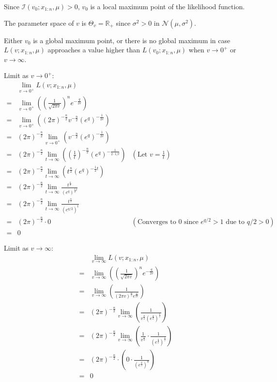 \documentclass{article}
\begin{document}
\begin{ssolution}
Since \(\mathcal{I}(v_0;x_{1:n},\mu) > 0\), \(v_0\) is a local maximum point of the likelihood function.

The parameter space of \(v\)  is \(\Theta_v = \mathbb{R_+}\) since \(\sigma^2>0\) in \(\mathcal{N}(\mu,\sigma^2)\).

Either \(v_0\) is a global maximum point, or there is no global maximum in case
\(L(v;x_{1:n},\mu)\) approaches a value higher than \(L(v_0;x_{1:n},\mu)\) when
\(v \to 0^+\) or \(v \to \infty\).

Limit as \(v\to 0^+\):
\begin{align*}
	& \lim_{v\to 0^+} L(v;x_{1:n},\mu) \\
	=& \lim_{v\to 0^+} \left(\left(\frac{1}{\sqrt{2\pi v}}\right)^n e^{-\frac{q}{2v}} \right) \\
	=& \lim_{v\to 0^+} \left((2\pi)^{-\frac{n}{2}}v^{-\frac{n}{2}} (e^{q})^{-\frac{1}{2v}} \right) \\
	=& (2\pi)^{-\frac{n}{2}}\lim_{v\to 0^+} \left(v^{-\frac{n}{2}} (e^{q})^{-\frac{1}{2v}} \right) \\
	=& (2\pi)^{-\frac{n}{2}}\lim_{t\to \infty} \left(\left(\frac{1}{t}\right)^{-\frac{n}{2}} (e^{q})^{-\frac{1}{2\cdot 1/t}} \right) & (\text{Let }v=\frac{1}{t}) \\
	=& (2\pi)^{-\frac{n}{2}}\lim_{t\to \infty} \left(t^{\frac{n}{2}} (e^{q})^{-\frac{1}{2}t} \right) \\
	=& (2\pi)^{-\frac{n}{2}}\lim_{t\to \infty} \frac{t^{\frac{n}{2}}}{(e^{q})^{\frac{1}{2}t}} \\
	=& (2\pi)^{-\frac{n}{2}}\lim_{t\to \infty} \frac{t^{\frac{n}{2}}}{(e^{q/2})^{t}} \\
	=& (2\pi)^{-\frac{n}{2}}\cdot 0 & (\text{Converges to }0\text{ since }e^{q/2}>1\text{ due to }q/2>0) \\
	=& 0
\end{align*}

Limit as \(v \to \infty\):
\begin{align*}
	& \lim_{v\to \infty} L(v;x_{1:n},\mu) \\
	=& \lim_{v\to \infty} \left(\left(\frac{1}{\sqrt{2\pi v}}\right)^n e^{-\frac{q}{2v}} \right) \\
	=& \lim_{v\to \infty} \left(\frac{1}{(2\pi v)^{\frac{n}{2}}e^{\frac{q}{2v}}} \right) \\
	=& (2\pi)^{-\frac{n}{2}}\lim_{v\to \infty} \left(\frac{1}{v^{\frac{n}{2}}(e^{\frac{q}{2}})^\frac{1}{v}} \right) \\
	=& (2\pi)^{-\frac{n}{2}}\lim_{v\to \infty} \left(\frac{1}{v^{\frac{n}{2}}}\cdot\frac{1}{(e^{\frac{q}{2}})^\frac{1}{v}} \right) \\
	=& (2\pi)^{-\frac{n}{2}}\cdot \left(0\cdot\frac{1}{(e^{\frac{q}{2}})^0}\right) \\
	=& 0
\end{align*}


\end{ssolution}
\end{document}
